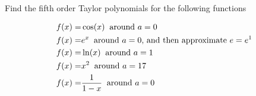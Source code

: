 \documentclass[main.tex]{subfiles}
\begin{document}
Find the fifth order Taylor polynomials for the following functions

\begin{align}
f(x) =& \cos(x) \;\; \text{around $ a = 0$}\\
f(x) =& e^x \;\; \text{around $ a = 0 $, and then approximate $e = e^1$} \\
f(x) =& \ln(x) \;\; \text{around $ a = 1$}\\
f(x) =& x^2 \;\; \text{around $ a = 17$}\\
f(x) =& \frac{1}{1-x} \;\; \text{around $ a = 0$}
\end{align}
\end{document}

